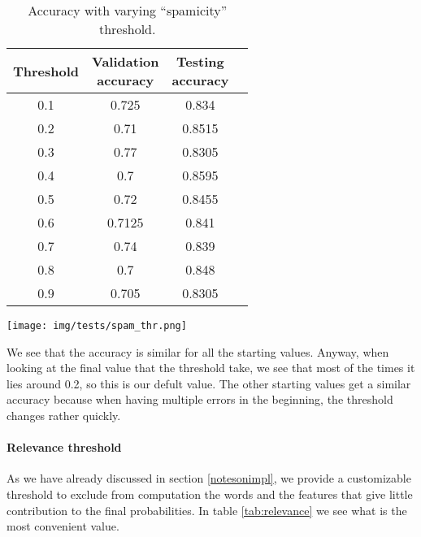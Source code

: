 \begin{center}
\begin{table}[h]
\begin{minipage}{.5\linewidth}
\begin{tabular}{cccc}
\toprule
Threshold & \shortstack{Validation\\ accuracy} & \shortstack{Testing\\ accuracy}\\
\midrule
0.1  & 0.725 & 0.834\\
0.2  & 0.71 & 0.8515 \\
0.3  & 0.77 & 0.8305 \\
0.4  & 0.7 & 0.8595 \\
0.5  & 0.72 & 0.8455 \\
0.6  & 0.7125 & 0.841 \\
0.7  & 0.74 & 0.839 \\
0.8  & 0.7 & 0.848 \\
0.9  & 0.705 & 0.8305 \\
\bottomrule
\end{tabular}
\end{minipage}
\begin{minipage}{.5\linewidth}
\texttt{[image: img/tests/spam\_thr.png]}
    \label{fig:spamthr}
\end{minipage}
\caption{Accuracy with varying ``spamicity'' threshold.}
\end{table}
\label{tab:spamthr}
\end{center}

We see that the accuracy is similar for all the starting values. Anyway, when looking at the final value that the threshold take, we see that most of the times it lies around 0.2, so this is our defult value. The other starting values get a similar accuracy because when having multiple errors in the beginning, the threshold changes rather quickly.

\paragraph{Relevance threshold}
As we have already discussed in section \ref{notesonimpl}, we provide a customizable threshold to exclude from computation the words and the features that give little contribution to the final probabilities. In table \ref{tab:relevance} we see what is the most convenient value.

